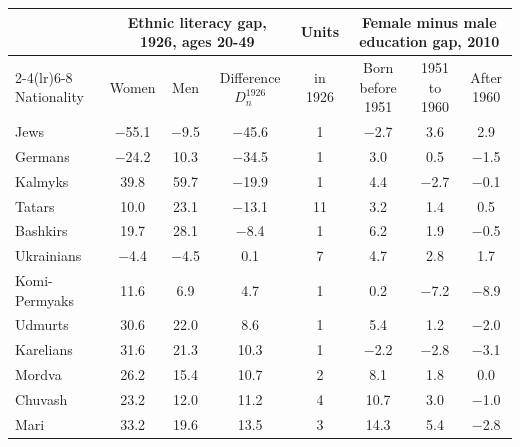 \begin{tabular}{lccccccc}
\toprule
 & \multicolumn{3}{c}{Ethnic literacy gap, 1926, ages 20-49} & Units & \multicolumn{3}{c}{Female minus male education gap, 2010} \\
\cmidrule(lr){2-4}\cmidrule(lr){6-8}
Nationality & Women & Men & Difference $D^{1926}_n$ & in 1926 & Born before 1951 & 1951 to 1960 & After 1960 \\
\midrule
Jews & $-$55.1 & $-$9.5 & $-$45.6 & 1 & $-$2.7 & 3.6 & 2.9 \\
Germans & $-$24.2 & 10.3 & $-$34.5 & 1 & 3.0 & 0.5 & $-$1.5 \\
Kalmyks & 39.8 & 59.7 & $-$19.9 & 1 & 4.4 & $-$2.7 & $-$0.1 \\
Tatars & 10.0 & 23.1 & $-$13.1 & 11 & 3.2 & 1.4 & 0.5 \\
Bashkirs & 19.7 & 28.1 & $-$8.4 & 1 & 6.2 & 1.9 & $-$0.5 \\
Ukrainians & $-$4.4 & $-$4.5 & 0.1 & 7 & 4.7 & 2.8 & 1.7 \\
Komi-Permyaks & 11.6 & 6.9 & 4.7 & 1 & 0.2 & $-$7.2 & $-$8.9 \\
Udmurts & 30.6 & 22.0 & 8.6 & 1 & 5.4 & 1.2 & $-$2.0 \\
Karelians & 31.6 & 21.3 & 10.3 & 1 & $-$2.2 & $-$2.8 & $-$3.1 \\
Mordva & 26.2 & 15.4 & 10.7 & 2 & 8.1 & 1.8 & 0.0 \\
Chuvash & 23.2 & 12.0 & 11.2 & 4 & 10.7 & 3.0 & $-$1.0 \\
Mari & 33.2 & 19.6 & 13.5 & 3 & 14.3 & 5.4 & $-$2.8 \\
\bottomrule
\end{tabular}
